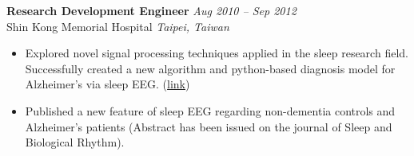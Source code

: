 \vspace{0.3em}
\textbf{\sffamily Research Development Engineer} \hfill \textit{Aug 2010 -- Sep 2012} \\
{\sffamily Shin Kong Memorial Hospital} \hfill \textit{Taipei, Taiwan}
\vspace{0.1em}

\begin{itemize}[leftmargin=*, topsep=2pt, partopsep=2.5pt]
\setlength\itemsep{0.3em}
\item Explored novel signal processing techniques applied in the sleep research field. Successfully created a new algorithm and python-based diagnosis model for Alzheimer’s via sleep EEG. (\href{http://goo.gl/k5Yu9i}{link})
\item Published a new feature of sleep EEG regarding non-dementia controls and Alzheimer’s patients (Abstract has been issued on the journal of Sleep and Biological Rhythm).
\end{itemize}
